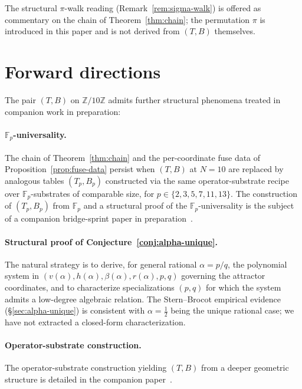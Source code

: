 \documentclass[11pt,reqno]{amsart}
\theoremstyle{plain}
\theoremstyle{definition}
\theoremstyle{remark}
\newcommand{\Z}{\mathbb{Z}}
\newcommand{\F}{\mathbb{F}}
\newcommand{\Zten}{\Z/10\Z}
\begin{document}
The structural $\pi$-walk reading
(Remark~\ref{rem:sigma-walk}) is offered as commentary on the
chain of Theorem~\ref{thm:chain}; the permutation $\pi$ is
introduced in this paper and is not derived from $(T, B)$
themselves.

\section{Forward directions}\label{sec:forward}

The pair $(T, B)$ on $\Zten$ admits further structural phenomena
treated in companion work in preparation:

\paragraph{$\F_{p}$-universality.} The chain of
Theorem~\ref{thm:chain} and the per-coordinate fuse data of
Proposition~\ref{prop:fuse-data} persist when $(T, B)$ at
$N = 10$ are replaced by analogous tables $(T_{p}, B_{p})$
constructed via the same operator-substrate recipe over
$\F_{p}$-substrates of comparable size, for
$p \in \{2, 3, 5, 7, 11, 13\}$. The construction of
$(T_{p}, B_{p})$ from $\F_{p}$ and a structural proof of the
$\F_{p}$-universality is the subject of a companion bridge-sprint
paper in
preparation~\cite{SandersClaudeChat2026BridgeSprint}.

\paragraph{Structural proof of Conjecture~\ref{conj:alpha-unique}.}
The natural strategy is to derive, for general rational
$\alpha = p/q$, the polynomial system in
$(v(\alpha), h(\alpha), \beta(\alpha), r(\alpha), p, q)$
governing the attractor coordinates, and to characterize
specializations $(p, q)$ for which the system admits a
low-degree algebraic relation. The Stern--Brocot empirical
evidence (\S\ref{sec:alpha-unique}) is consistent with
$\alpha = \tfrac12$ being the unique rational case; we have not
extracted a closed-form characterization.

\paragraph{Operator-substrate construction.}
The operator-substrate construction yielding $(T, B)$ from a
deeper geometric structure is detailed in the companion
paper~\cite{SandersGish2026Sigma}.
\end{document}
